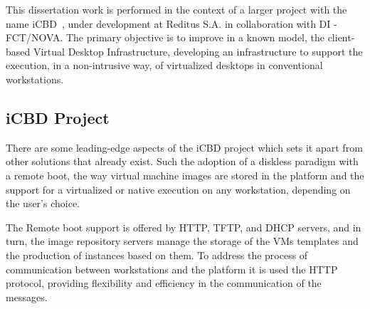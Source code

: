 This dissertation work is performed in the context of a larger project with the name \gls{iCBD}~\cite{Lopes2017}, under development at Reditus S.A. in collaboration with DI - FCT/NOVA.
The primary objective is to improve in a known model, the client-based Virtual Desktop Infrastructure, developing an infrastructure to support the execution, in a non-intrusive way, of virtualized desktops in conventional workstations.





\subsection{iCBD Project} %
\label{sub:icbd_project}


There are some leading-edge aspects of the \gls{iCBD} project which sets it apart from other solutions that already exist. Such the adoption of a diskless paradigm with a remote boot, the way virtual machine images are stored in the platform and the support for a virtualized or native execution on any workstation, depending on the user's choice.~\cite{P2020}

The Remote boot support is offered by HTTP, TFTP, and DHCP servers, and in turn, the image repository servers manage the storage of the VMs templates and the production of instances based on them.
To address the process of communication between workstations and the platform it is used the HTTP protocol, providing flexibility and efficiency in the communication of the messages.~\cite{P2020,Nuno2016,Eduardo2016}

